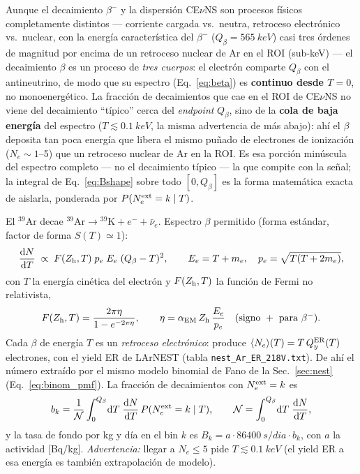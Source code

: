 \documentclass[11pt,a4paper]{article}
\newcommand{\Ne}{N_{e}}
\newcommand{\code}[1]{\texttt{#1}}
\newcommand{\dd}{\mathrm{d}}
\begin{document}
Aunque el decaimiento $\beta^{-}$ y la dispersi\'on CE$\nu$NS son procesos
f\'isicos completamente distintos --- corriente cargada vs.\ neutra, retroceso
electr\'onico vs.\ nuclear, con la energ\'ia caracter\'istica del $\beta^{-}$
($Q_{\beta}=\SI{565}{keV}$) casi tres \'ordenes de magnitud por encima de un
retroceso nuclear de Ar en el ROI (sub-keV) --- el decaimiento $\beta$ es un
proceso de \emph{tres cuerpos}: el electr\'on comparte $Q_{\beta}$ con el
antineutrino, de modo que su espectro (Eq.~\eqref{eq:beta}) es
\textbf{continuo desde $T=0$}, no monoenerg\'etico. La fracci\'on de
decaimientos que cae en el ROI de CE$\nu$NS no viene del decaimiento
``t\'ipico'' cerca del \emph{endpoint} $Q_{\beta}$, sino de la \textbf{cola de
baja energ\'ia} del espectro ($T\lesssim\SI{0.1}{keV}$, la misma advertencia
de m\'as abajo): ah\'i el $\beta$ deposita tan poca energ\'ia que libera el
mismo pu\~nado de electrones de ionizaci\'on ($\Ne\sim1$--5) que un retroceso
nuclear de Ar en la ROI. Es esa porci\'on min\'uscula del espectro completo
--- no el decaimiento t\'ipico --- la que compite con la se\~nal; la integral
de Eq.~\eqref{eq:Bshape} sobre todo $[0,Q_{\beta}]$ es la forma matem\'atica
exacta de aislarla, ponderada por $P(\Ne^{\rm ext}=k\mid T)$.

El $^{39}$Ar decae $^{39}\mathrm{Ar}\to{}^{39}\mathrm{K} + e^{-} + \bar\nu_{e}$.
Espectro $\beta$ permitido (forma est\'andar, factor de forma $S(T)\simeq 1$):
\begin{equation}
  \label{eq:beta}
  \frac{\dd N}{\dd T}
  \;\propto\; F(Z_{\rm h}, T)\; p_{e}\; E_{e}\; (Q_{\beta} - T)^{2},
  \qquad
  E_{e} = T + m_{e},\quad
  p_{e} = \sqrt{T(T + 2m_{e})},
\end{equation}
con $T$ la energ\'ia cin\'etica del electr\'on y $F(Z_{\rm h},T)$ la funci\'on de
Fermi no relativista,
\begin{equation}
  \label{eq:fermi}
  F(Z_{\rm h}, T) = \frac{2\pi\eta}{1 - e^{-2\pi\eta}},
  \qquad
  \eta = \alpha_{\rm EM}\,Z_{\rm h}\,\frac{E_{e}}{p_{e}}
  \quad (\text{signo}~+~\text{para}~\beta^{-}).
\end{equation}
Cada $\beta$ de energ\'ia $T$ es un \emph{retroceso electr\'onico}: produce
$\langle\Ne\rangle(T) = T\,Q_{y}^{\rm ER}(T)$ electrones, con el yield ER de
LArNEST (tabla \code{nest\_Ar\_ER\_218V.txt}). De ah\'i el n\'umero extra\'ido por
el mismo modelo binomial de Fano de la Sec.~\ref{sec:nest} (Eq.~\eqref{eq:binom_pmf}).
La fracci\'on de decaimientos con $\Ne^{\rm ext}=k$ es
\begin{equation}
  \label{eq:Bshape}
  b_{k}
  = \frac{1}{\mathcal{N}}
    \int_{0}^{Q_{\beta}}\!\dd T\;
    \frac{\dd N}{\dd T}\,
    P(\Ne^{\rm ext}=k\mid T),
  \qquad
  \mathcal{N} = \int_{0}^{Q_{\beta}}\!\dd T\;\frac{\dd N}{\dd T},
\end{equation}
y la tasa de fondo por kg y d\'ia en el bin $k$ es
$B_{k} = a\cdot\SI{86400}{s/dia}\cdot b_{k}$, con $a$ la actividad
[\si{Bq/kg}]. \emph{Advertencia:} llegar a $\Ne\le5$ pide $T\lesssim\SI{0.1}{keV}$
(el yield ER a esa energ\'ia es tambi\'en extrapolaci\'on de modelo).
\end{document}
